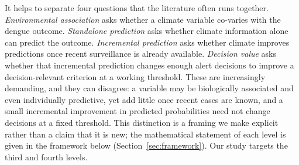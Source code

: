 \documentclass[11pt,a4paper]{article}
\begin{document}
It helps to separate four questions that the literature often runs together. \emph{Environmental association} asks whether a climate variable co-varies with the dengue outcome. \emph{Standalone prediction} asks whether climate information alone can predict the outcome. \emph{Incremental prediction} asks whether climate improves predictions once recent surveillance is already available. \emph{Decision value} asks whether that incremental prediction changes enough alert decisions to improve a decision-relevant criterion at a working threshold. These are increasingly demanding, and they can disagree: a variable may be biologically associated and even individually predictive, yet add little once recent cases are known, and a small incremental improvement in predicted probabilities need not change decisions at a fixed threshold. This distinction is a framing we make explicit rather than a claim that it is new; the mathematical statement of each level is given in the framework below (Section~\ref{sec:framework}). Our study targets the third and fourth levels.
\end{document}
